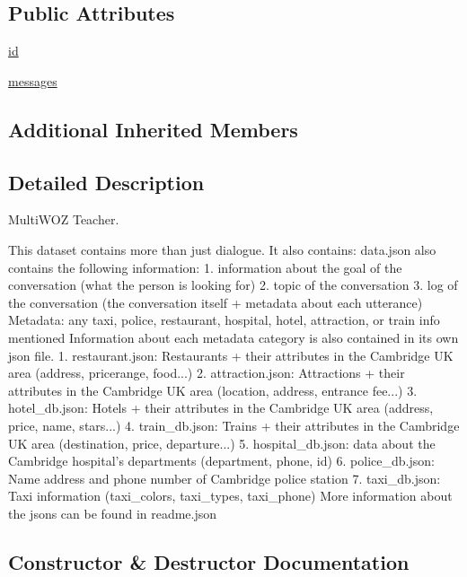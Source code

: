 \subsection*{Public Attributes}
\begin{DoxyCompactItemize}
\item 
\hyperlink{classparlai_1_1tasks_1_1multiwoz_1_1agents_1_1MultiWozTeacher_a8e59cea446db2909435c9bac275e2539}{id}
\item 
\hyperlink{classparlai_1_1tasks_1_1multiwoz_1_1agents_1_1MultiWozTeacher_a40d3917ab5dadef1f822ac3c1d06c915}{messages}
\end{DoxyCompactItemize}
\subsection*{Additional Inherited Members}


\subsection{Detailed Description}
\begin{DoxyVerb}MultiWOZ Teacher.

This dataset contains more than just dialogue. It also contains:
data.json also contains the following information:
1. information about the goal of the conversation (what the person is looking for)
2. topic of the conversation
3. log of the conversation (the conversation itself + metadata about each utterance)
      Metadata: any taxi, police, restaurant, hospital, hotel, attraction, or train info mentioned
Information about each metadata category is also contained in its own json file.
1. restaurant.json: Restaurants + their attributes in the Cambridge UK area (address, pricerange, food...)
2. attraction.json: Attractions + their attributes in the Cambridge UK area (location, address, entrance fee...)
3. hotel_db.json: Hotels + their attributes in the Cambridge UK area  (address, price, name, stars...)
4. train_db.json: Trains + their attributes in the Cambridge UK area (destination, price, departure...)
5. hospital_db.json: data about the Cambridge hospital's departments (department, phone, id)
6. police_db.json: Name address and phone number of Cambridge police station
7. taxi_db.json: Taxi information (taxi_colors, taxi_types, taxi_phone)
More information about the jsons can be found in readme.json
\end{DoxyVerb}
 

\subsection{Constructor \& Destructor Documentation}
\mbox{\label{classparlai_1_1tasks_1_1multiwoz_1_1agents_1_1MultiWozTeacher_aa4f519ba640d9ddb296af9120d188d7e}} 
